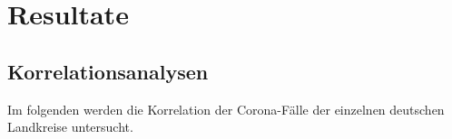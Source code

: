 \chapter{Resultate}\label{chap:Durchführung}
\section{Korrelationsanalysen}
Im folgenden werden die Korrelation der Corona-Fälle der einzelnen deutschen Landkreise untersucht.





